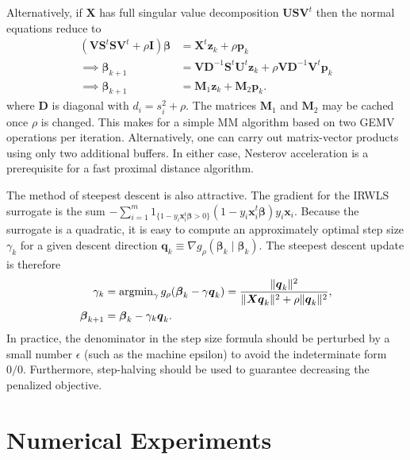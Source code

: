 \documentclass[11pt]{article}
\def\argmin{\mathop{\rm argmin}\nolimits}
\newcommand{\bp}{\boldsymbol{p}}
\newcommand{\bq}{\boldsymbol{q}}
\newcommand{\bx}{\boldsymbol{x}}
\newcommand{\bz}{\boldsymbol{z}}
\newcommand{\bD}{\boldsymbol{D}}
\newcommand{\bI}{\boldsymbol{I}}
\newcommand{\bM}{\boldsymbol{M}}
\newcommand{\bS}{\boldsymbol{S}}
\newcommand{\bU}{\boldsymbol{U}}
\newcommand{\bV}{\boldsymbol{V}}
\newcommand{\bX}{\boldsymbol{X}}
\newcommand{\bbeta}{\boldsymbol{\beta}}
\begin{document}
Alternatively, if $\bX$ has full singular value decomposition $\bU \bS \bV^{t}$ then the normal equations reduce to
\begin{equation}
\label{alg:MM}
\begin{aligned}
    (\bV \bS^{t} \bS \bV^{t} + \rho \bI) \bbeta &= \bX^{t} \bz_{k} + \rho \bp_{k} \\
    \implies \bbeta_{k+1} &= \bV \bD^{-1} \bS^{t} \bU^{t} \bz_{k}
    + \rho \bV \bD^{-1} \bV^{t} \bp_{k} \\
    \implies \bbeta_{k+1} &= \bM_{1} \bz_{k} + \bM_{2} \bp_{k}.
\end{aligned}
\end{equation}
where $\bD$ is diagonal with $d_{i} = s_{i}^{2} + \rho$.
The matrices $\bM_{1}$ and $\bM_{2}$ may be cached once $\rho$ is changed.
This makes for a simple MM algorithm based on two GEMV operations per iteration.
Alternatively, one can carry out matrix-vector products using only two additional buffers.
In either case, Nesterov acceleration is a prerequisite for a fast proximal distance algorithm.

The method of steepest descent is also attractive.
The gradient for the IRWLS surrogate is the sum $-\sum_{i=1}^m 1_{\{1-y_i\bx_i^t\bbeta > 0\}}(1-y_i\bx_i^t\bbeta)y_i\bx_i$.
Because the surrogate is a quadratic, it is easy to compute an approximately optimal step size $\gamma_{k}$ for a given descent direction $\bq_{k} \equiv \nabla g_{\rho}(\bbeta_{k} \mid \bbeta_{k})$.
The steepest descent update is therefore
\begin{equation}
\label{alg:SD}
\begin{aligned}
    \gamma_{k} &= \argmin_{\gamma} g_{\rho}(\bbeta_{k} - \gamma \bq_{k})
    = \frac{\|\bq_{k}\|^{2}}{\|\bX \bq_{k}\|^{2} + \rho \|\bq_{k}\|^{2}}, \\
    \bbeta_{k+1} &= \bbeta_{k} - \gamma_{k} \bq_{k}.
\end{aligned}
\end{equation}
In practice, the denominator in the step size formula should be perturbed by a small number $\epsilon$ (such as the machine epsilon) to avoid the indeterminate form $0 / 0$.
Furthermore, step-halving should be used to guarantee decreasing the penalized objective.

\section*{\center Numerical Experiments}
\end{document}
